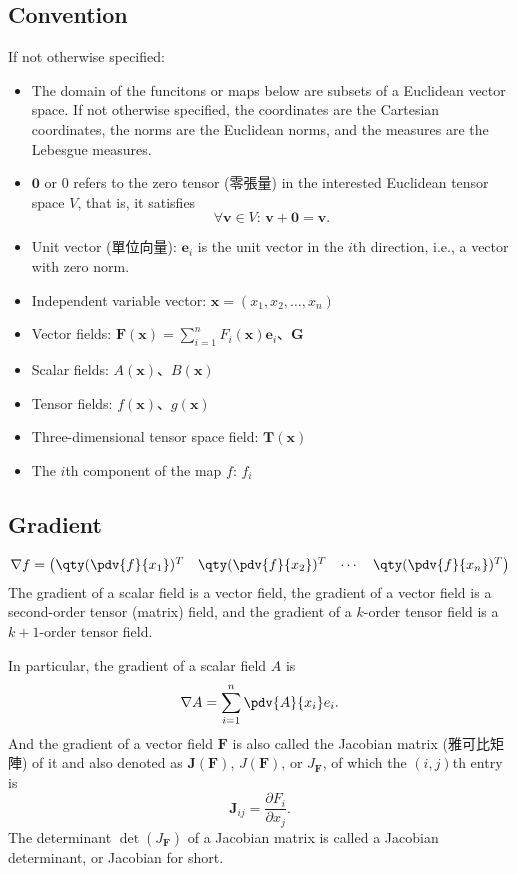 \documentclass[a4paper,12pt]{report}
\begin{document}
\subsection{Convention}
If not otherwise specified:
\begin{itemize}
\item The domain of the funcitons or maps below are subsets of a Euclidean vector space. If not otherwise specified, the coordinates are the Cartesian coordinates, the norms are the Euclidean norms, and the measures are the Lebesgue measures.
\item $\mathbf{0}$ or $0$ refers to the zero tensor (零張量) in the interested Euclidean tensor space $V$, that is, it satisfies 
\[\forall\mathbf{v}\in V:\,\mathbf{v}+\mathbf{0}=\mathbf{v}.\]
\item Unit vector (單位向量): $\mathbf{e}_i$ is the unit vector in the $i$th direction, i.e., a vector with zero norm.
\item Independent variable vector: $\mathbf{x}=(x_1,x_2,\dots,x_n)$
\item Vector fields: $\mathbf{F}(\mathbf{x}) = \sum_{i=1}^n F_i(\mathbf{x}) \mathbf{e}_i$、$\mathbf{G}$
\item Scalar fields: $A(\mathbf{x})$、$B(\mathbf{x})$
\item Tensor fields: $f(\mathbf{x})$、$g(\mathbf{x})$
\item Three-dimensional tensor space field: $\mathbf{T}(\mathbf{x})$
\item The $i$th component of the map $f$: $f_i$
\end{itemize}
\subsection{Gradient}
\[
\nabla f = \begin{pmatrix}\qty(\pdv{f}{x_1})^T & \qty(\pdv{f}{x_2})^T & \cdots & \qty(\pdv{f}{x_n})^T\end{pmatrix}
\]
The gradient of a scalar field is a vector field, the gradient of a vector field is a second-order tensor (matrix) field, and the gradient of a $k$-order tensor field is a $k+1$-order tensor field. 

In particular, the gradient of a scalar field $A$ is
\[
\nabla A = \sum_{i=1}^n \pdv{A}{x_i}e_i.
\]
And the gradient of a vector field $\mathbf{F}$ is also called the Jacobian matrix (雅可比矩陣) of it and also denoted as $\mathbf{J}(\mathbf{F})$, $J(\mathbf{F})$, or $J_{\mathbf{F}}$, of which the $( i,j )$th entry is
\[\mathbf{J}_{ij}=\frac{\partial F_i}{\partial x_j}.\]
The determinant $\det\left(J_{\mathbf{F}}\right)$ of a Jacobian matrix is called a Jacobian determinant, or Jacobian for short.
\end{document}
